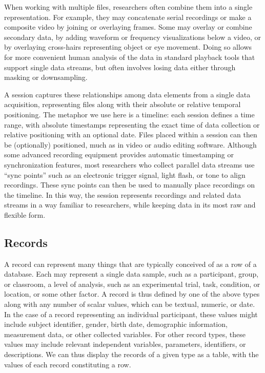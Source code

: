 \documentclass{sig-alternate}
\begin{document}
When working with multiple files, researchers often combine them into a single representation.
For example, they may concatenate serial recordings or make a composite video by joining or overlaying frames.
Some may overlay or combine secondary data, by adding waveform or frequency visualizations below a video, or by overlaying cross-hairs representing object or eye movement.
Doing so allows for more convenient human analysis of the data in standard playback tools that support single data streams, but often involves losing data either through masking or downsampling.

A session captures these relationships among data elements from a single data acquisition, representing files along with their absolute or relative temporal positioning.
The metaphor we use here is a timeline: each session defines a time range, with absolute timestamps representing the exact time of data collection or relative positioning with an optional date.
Files placed within a session can then be (optionally) positioned, much as in video or audio editing software.
Although some advanced recording equipment provides automatic timestamping or synchronization features, most researchers who collect parallel data streams use ``sync points'' such as an electronic trigger signal, light flash, or tone to align recordings.
These sync points can then be used to manually place recordings on the timeline.
In this way, the session represents recordings and related data streams in a way familiar to researchers, while keeping data in its most raw and flexible form.

\subsection{Records}

A record can represent many things that are typically conceived of as a row of a database.
Each may represent a single data sample, such as a participant, group, or classroom, a level of analysis, such as an experimental trial, task, condition, or location, or some other factor. 
A record is thus defined by one of the above types along with any number of scalar values, which can be textual, numeric, or date.
In the case of a record representing an individual participant, these values might include subject identifier, gender, birth date, demographic information, measurement data, or other collected variables.
For other record types, these values may include relevant independent variables, parameters, identifiers, or descriptions. 
We can thus display the records of a given type as a table, with the values of each record constituting a row.
\end{document}
